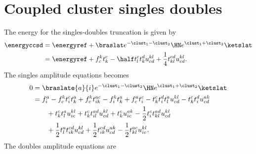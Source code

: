     \section{Coupled cluster singles doubles}
        The energy for the singles-doubles truncation is given by
        \begin{align}
            \energyccsd
            &= \energyref
            + \braslat e^{-\clust_1 - \clust_2} \HN e^{\clust_1 + \clust_2}
            \ketslat
            \\
            &=
            \energyref
            +
            f^{k}_{c} t^{c}_{k}
            - \half t^{c}_{l} t^{d}_{k} u^{kl}_{cd}
            + \frac{1}{4} t^{cd}_{kl} u^{kl}_{cd}.
        \end{align}
        The singles amplitude equations becomes
        \begin{align}
            0 & = \braslate{a}{i} e^{-\clust_1 - \clust_2} \HN
            e^{\clust_1 + \clust_2}\ketslat
            \\
            &=
            f^{a}_{i}
            - f^{k}_{c} t^{c}_{i} t^{a}_{k}
            + f^{k}_{c} t^{ac}_{ik}
            - f^{k}_{i} t^{a}_{k}
            + f^{a}_{c} t^{c}_{i}
            - t^{c}_{k} t^{d}_{i} t^{a}_{l} u^{kl}_{cd}
            - t^{c}_{k} t^{d}_{i} u^{ak}_{cd}
            \nonumber \\
            &\qquad
            + t^{c}_{k} t^{a}_{l} u^{kl}_{ic}
            + t^{c}_{k} t^{ad}_{il} u^{kl}_{cd}
            + t^{c}_{k} u^{ak}_{ic}
            - \frac{1}{2} t^{c}_{i} t^{ad}_{kl} u^{kl}_{cd}
            \nonumber \\
            &\qquad
            + \frac{1}{2} t^{a}_{l} t^{cd}_{ik} u^{kl}_{cd}
            + \frac{1}{2} t^{cd}_{ik} u^{ak}_{cd}
            - \frac{1}{2} t^{ac}_{kl} u^{kl}_{ic}.
        \end{align}
        The doubles amplitude equations are
